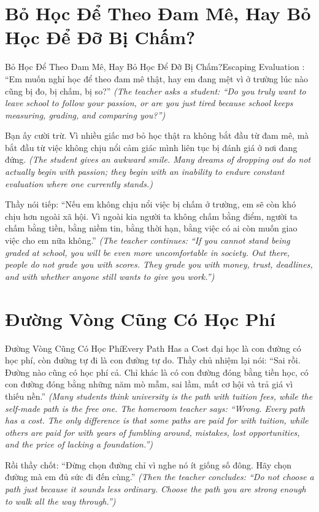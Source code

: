 \section{Bỏ Học Để Theo Đam Mê, Hay Bỏ Học Để Đỡ Bị Chấm?}
\begin{truyen}{Bỏ Học Để Theo Đam Mê, Hay Bỏ Học Để Đỡ Bị Chấm?}{Escaping Evaluation}
: ``Em muốn nghỉ học để theo đam mê thật, hay em đang mệt vì ở trường lúc nào cũng bị đo, bị chấm, bị so?''
\textit{(The teacher asks a student: ``Do you truly want to leave school to follow your passion, or are you just tired because school keeps measuring, grading, and comparing you?'')}

Bạn ấy cười trừ. Vì nhiều giấc mơ bỏ học thật ra không bắt đầu từ đam mê, mà bắt đầu từ việc không chịu nổi cảm giác mình liên tục bị đánh giá ở nơi đang đứng.
\textit{(The student gives an awkward smile. Many dreams of dropping out do not actually begin with passion; they begin with an inability to endure constant evaluation where one currently stands.)}

Thầy nói tiếp: ``Nếu em không chịu nổi việc bị chấm ở trường, em sẽ còn khó chịu hơn ngoài xã hội. Vì ngoài kia người ta không chấm bằng điểm, người ta chấm bằng tiền, bằng niềm tin, bằng thời hạn, bằng việc có ai còn muốn giao việc cho em nữa không.''
\textit{(The teacher continues: ``If you cannot stand being graded at school, you will be even more uncomfortable in society. Out there, people do not grade you with scores. They grade you with money, trust, deadlines, and with whether anyone still wants to give you work.'')}
\end{truyen}

\section{Đường Vòng Cũng Có Học Phí}
\begin{truyen}{Đường Vòng Cũng Có Học Phí}{Every Path Has a Cost}
 đại học là con đường có học phí, còn đường tự đi là con đường tự do. Thầy chủ nhiệm lại nói: ``Sai rồi. Đường nào cũng có học phí cả. Chỉ khác là có con đường đóng bằng tiền học, có con đường đóng bằng những năm mò mẫm, sai lầm, mất cơ hội và trả giá vì thiếu nền.''
\textit{(Many students think university is the path with tuition fees, while the self-made path is the free one. The homeroom teacher says: ``Wrong. Every path has a cost. The only difference is that some paths are paid for with tuition, while others are paid for with years of fumbling around, mistakes, lost opportunities, and the price of lacking a foundation.'')}

Rồi thầy chốt: ``Đừng chọn đường chỉ vì nghe nó ít giống số đông. Hãy chọn đường mà em đủ sức đi đến cùng.''
\textit{(Then the teacher concludes: ``Do not choose a path just because it sounds less ordinary. Choose the path you are strong enough to walk all the way through.'')}
\end{truyen}

